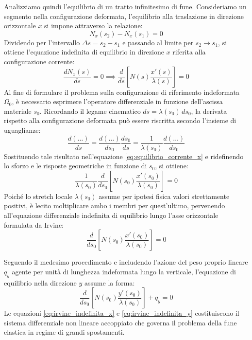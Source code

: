\vspace{1em}
Analizziamo quindi l'equilibrio di un tratto infinitesimo di fune. Consideriamo un segmento nella configurazione deformata, l'equilibrio alla traslazione in direzione orizzontale $x$ si impone attraverso la relazione:
\begin{equation}
   N_x(s_2) - N_x(s_1) = 0
\end{equation}
Dividendo per l'intervallo $\Delta s = s_2 - s_1$ e passando al limite per $s_2 \rightarrow s_1$, si ottiene l'equazione indefinita di equilibrio in direzione $x$ riferita alla configurazione corrente:
\begin{equation}
   \frac{d N_x(s)}{ds} = 0 \implies \frac{d}{ds} \left[ N(s) \frac{x'(s)}{\lambda(s)} \right] = 0
   \label{eq:equilibrio_corrente_x}
\end{equation} 
Al fine di formulare il problema sulla configurazione di riferimento indeformata $\Omega_0$, è necessario esprimere l'operatore differenziale in funzione dell'ascissa materiale $s_0$. Ricordando il legame cinematico $ds = \lambda(s_0) \, ds_0$, la derivata rispetto alla configurazione deformata può essere riscritta secondo l'insieme di uguaglianze:
\begin{equation}
   \frac{d(\dots)}{ds} = \frac{d(\dots)}{ds_0} \frac{ds_0}{ds} = \frac{1}{\lambda(s_0)} \frac{d(\dots)}{ds_0}
\end{equation}
Sostituendo tale risultato nell'equazione \eqref{eq:equilibrio_corrente_x} e ridefinendo lo sforzo e le risposte geometriche in funzione di $s_0$, si ottiene:
\begin{equation}
   \frac{1}{\lambda(s_0)} \frac{d}{ds_0} \left[ N(s_0) \frac{x'(s_0)}{\lambda(s_0)} \right] = 0
\end{equation}
Poiché lo stretch locale $\lambda(s_0)$ assume per ipotesi fisica valori strettamente positivi, è lecito moltiplicare ambo i membri per quest'ultimo, pervenendo all'equazione differenziale indefinita di equilibrio lungo l'asse orizzontale formulata da Irvine:
\begin{equation}
   \frac{d}{ds_0} \left[ N(s_0) \frac{x'(s_0)}{\lambda(s_0)} \right] = 0
   \label{eq:irvine_indefinita_x}
\end{equation}

Seguendo il medesimo procedimento e includendo l'azione del peso proprio lineare $q_y$ agente per unità di lunghezza indeformata lungo la verticale, l'equazione di equilibrio nella direzione $y$ assume la forma:
\begin{equation}
   \frac{d}{ds_0} \left[ N(s_0) \frac{y'(s_0)}{\lambda(s_0)} \right] + q_y = 0
   \label{eq:irvine_indefinita_y}
\end{equation}
Le equazioni \eqref{eq:irvine_indefinita_x} e \eqref{eq:irvine_indefinita_y} costituiscono il sistema differenziale non lineare accoppiato che governa il problema della fune elastica in regime di grandi spostamenti.

